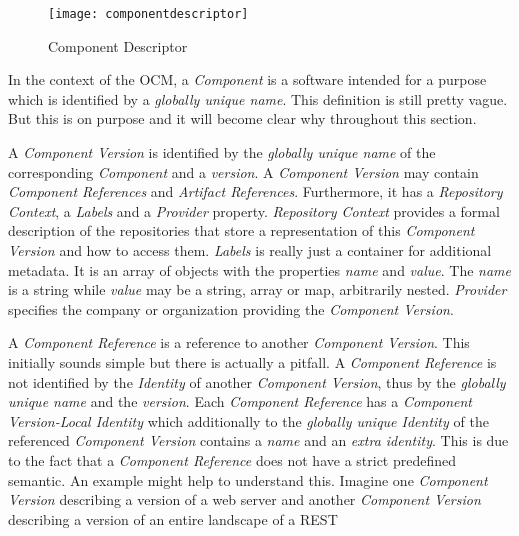 \begin{figure}[H]
	\centering
	\texttt{[image: componentdescriptor]}
	\caption[Component Descriptor]{Component Descriptor }
	\label{fig:ComponentDescriptor}
\end{figure}


\noindent In the context of the OCM, a \emph{Component} is a software intended for a purpose which is identified by a \emph{globally unique name}. This definition is still pretty vague. But this is on purpose and it will become clear why throughout this section.\par 
\noindent A \emph{Component Version} is identified by the \emph{globally unique name} of the corresponding \emph{Component} and a \emph{version}. A \emph{Component Version} may contain \emph{Component References} and \emph{Artifact References}. Furthermore, it has a \emph{Repository Context}, a \emph{Labels} and a \emph{Provider} property. \emph{Repository Context} provides a formal description of the repositories that store a representation of this \emph{Component Version} and how to access them. \emph{Labels} is really just a container for additional metadata. It is an array of objects with the properties \emph{name} and \emph{value}. The \emph{name} is a string while \emph{value} may be a string, array or map, arbitrarily nested. \emph{Provider} specifies the company or organization providing the \emph{Component Version}.\par 
\noindent A \emph{Component Reference} is a reference to another \emph{Component Version}. This initially sounds simple but there is actually a pitfall. A \emph{Component Reference} is not identified by the \emph{Identity} of another \emph{Component Version}, thus by the \emph{globally unique name} and the \emph{version}. Each \emph{Component Reference} has a \emph{Component Version-Local Identity} which additionally to the \emph{globally unique Identity} of the referenced \emph{Component Version} contains a \emph{name} and an \emph{extra identity}. This is due to the fact that a \emph{Component Reference} does not have a strict predefined semantic. An example might help to understand this. Imagine one \emph{Component Version} describing a version of a web server and another \emph{Component Version} describing a version of an entire landscape of a REST %
